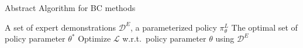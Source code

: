 \begin{algorithm}[t]
\caption{Abstract Algorithm for BC methods}\label{alg:bc}
\begin{algorithmic}
\REQUIRE A set of expert demonstrations $\mathcal{D}^{E}$, a parameterized policy $\pi_{\theta}^{L}$
\ENSURE The optimal set of policy parameter $\theta^{*}$
\STATE Optimize $\mathcal{L}$ w.r.t.\ policy parameter $\theta$ using $\mathcal{D}^{E}$
\end{algorithmic}
\end{algorithm}